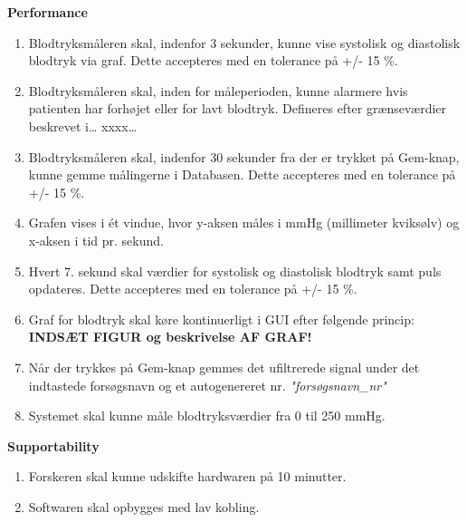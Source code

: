 \textbf{Performance}
\begin{enumerate}
\item Blodtryksmåleren skal, indenfor 3 sekunder, kunne vise systolisk og diastolisk blodtryk via graf. Dette accepteres med en tolerance på +/- 15 \%.
\item Blodtryksmåleren skal, inden for måleperioden, kunne alarmere hvis patienten har forhøjet eller for lavt blodtryk. Defineres efter grænseværdier beskrevet i… xxxx…
\item Blodtryksmåleren skal, indenfor 30 sekunder fra der er trykket på Gem-knap, kunne gemme målingerne i Databasen.  Dette accepteres med en tolerance på +/- 15 \%.
\item Grafen vises i ét vindue, hvor y-aksen måles i mmHg (millimeter kviksølv) og x-aksen i tid pr. sekund. 
\item Hvert 7. sekund skal værdier for systolisk og diastolisk blodtryk samt puls opdateres. Dette accepteres med en tolerance på +/- 15 \%.
\item Graf for blodtryk skal køre kontinuerligt i GUI efter følgende princip: \textbf{INDSÆT FIGUR og beskrivelse AF GRAF!}
\item Når der trykkes på Gem-knap gemmes det ufiltrerede signal under det indtastede forsøgsnavn og et autogenereret nr. \textit{"forsøgsnavn\_nr"}
\item Systemet skal kunne måle blodtryksværdier fra 0 til 250 mmHg.
\end{enumerate}


\textbf{Supportability}
\begin{enumerate}
\item Forskeren skal kunne udskifte hardwaren på 10 minutter. 
\item Softwaren skal opbygges med lav kobling. 
\end{enumerate}
















